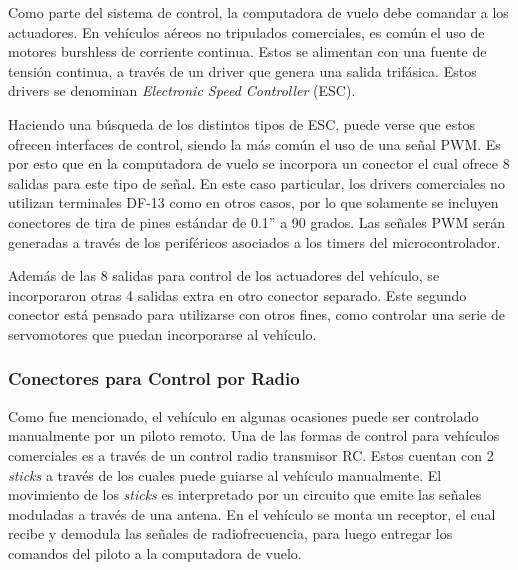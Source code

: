 Como parte del sistema de control, la computadora de vuelo debe comandar a los actuadores. En vehículos aéreos no tripulados comerciales, es común el uso de motores burshless de corriente continua. Estos se alimentan con una fuente de tensión continua, a través de un driver que genera una salida trifásica. Estos drivers se denominan \textit{Electronic Speed Controller} (ESC). 

Haciendo una búsqueda de los distintos tipos de ESC, puede verse que estos ofrecen interfaces de control, siendo la más común el uso de una señal PWM. Es por esto que en la computadora de vuelo se incorpora un conector el cual ofrece 8 salidas para este tipo de señal. En este caso particular, los drivers comerciales no utilizan terminales DF-13 como en otros casos, por lo que solamente se incluyen conectores de tira de pines estándar de 0.1” a 90 grados. Las señales PWM serán generadas a través de los periféricos asociados a los timers del microcontrolador.


Además de las 8 salidas para control de los actuadores del vehículo, se incorporaron otras 4 salidas extra en otro conector separado. Este segundo conector está pensado para utilizarse con otros fines, como controlar una serie de servomotores que puedan incorporarse al vehículo.


\subsubsection{Conectores para Control por Radio}


Como fue mencionado, el vehículo en algunas ocasiones puede ser controlado manualmente por un piloto remoto. Una de las formas de control para vehículos comerciales es a través de un control radio transmisor RC. Estos cuentan con 2 \textit{sticks} a través de los cuales puede guiarse al vehículo manualmente. El movimiento de los \textit{sticks} es interpretado por un circuito que emite las señales moduladas a través de una antena. En el vehículo se monta un receptor, el cual recibe y demodula las señales de radiofrecuencia, para luego entregar los comandos del piloto a la computadora de vuelo.

